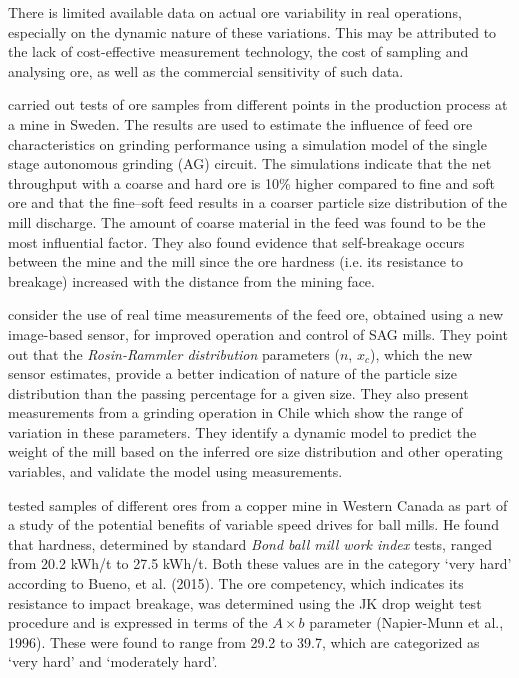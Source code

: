There is limited available data on actual ore variability in real operations, especially on the dynamic nature of these variations. This may be attributed to the lack of cost-effective measurement technology, the cost of sampling and analysing ore, as well as the commercial sensitivity of such data.

\cite{hahne_ore_2003} carried out tests of ore samples from different points in the production process at a mine in Sweden. The results are used to estimate the influence of feed ore characteristics on grinding performance using a simulation model of the single stage autonomous grinding (AG) circuit. The simulations indicate that the net throughput with a coarse and hard ore is 10\% higher compared to fine and soft ore and that the fine–soft feed results in a coarser particle size distribution of the mill discharge. The amount of coarse material in the feed was found to be the most influential factor. They also found evidence that self-breakage occurs between the mine and the mill since the ore hardness (i.e. its resistance to breakage) increased with the distance from the mining face.

\cite{nunez_characterization_2011} consider the use of real time measurements of the feed ore, obtained using a new image-based sensor, for improved operation and control of SAG mills. They point out that the \textit{Rosin-Rammler distribution} parameters ($n$, $x_c$), which the new sensor estimates, provide a better indication of nature of the particle size distribution than the passing percentage for a given size. They also present measurements from a grinding operation in Chile which show the range of variation in these parameters. They identify a dynamic model to predict the weight of the mill based on the inferred ore size distribution and other operating variables, and validate the model using measurements.

\cite{liu_development_2018} tested samples of different ores from a copper mine in Western Canada as part of a study of the potential benefits of variable speed drives for ball mills. He found that hardness, determined by standard \textit{Bond ball mill work index} tests, ranged from 20.2 kWh/t to 27.5 kWh/t. Both these values are in the category `very hard' according to Bueno, et al. (2015). The ore competency, which indicates its resistance to impact breakage, was determined using the JK drop weight test procedure and is expressed in terms of the $A\times{b}$ parameter (Napier-Munn et al., 1996). These were found to range from 29.2 to 39.7, which are categorized as `very hard' and `moderately hard'.

